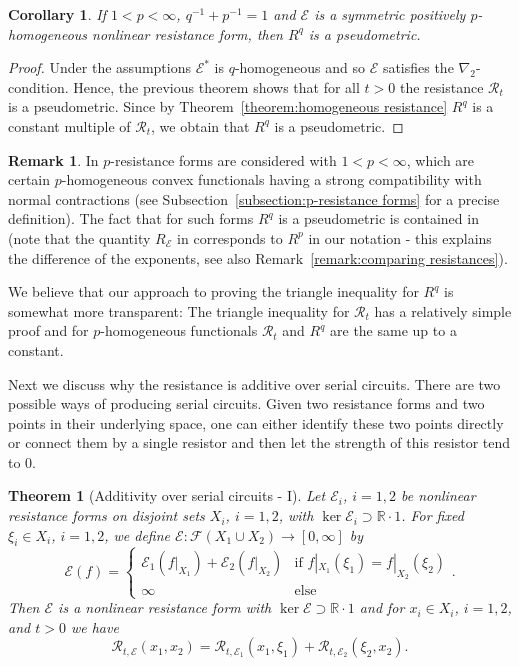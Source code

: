 \documentclass[a4paper,11pt,reqno]{amsart}
\newtheorem{theorem}[lemma]{Theorem}
\newtheorem{corollary}[lemma]{Corollary}
\theoremstyle{definition}
\newtheorem{remark}[lemma]{Remark}
\numberwithin{equation}{section}
\newcommand{\cR}{{\mathcal R}}
\newcommand{\cE}{{\mathcal E}}
\newcommand{\cF}{{\mathcal F}}
\newcommand{\R}{{\mathbb R}}
\newcommand{\1}{\mathds{1}}
\begin{document}
\begin{corollary}
 If $1 < p < \infty$, $q^{-1} + p^{-1} = 1$ and $\cE$ is a symmetric positively $p$-homogeneous nonlinear resistance form, then $R^q$ is a pseudometric. 
\end{corollary}
\begin{proof}
Under the assumptions $\cE^*$ is $q$-homogeneous and so $\cE$ satisfies the $\nabla_2$-condition. Hence, the previous theorem shows that for all $t> 0$ the resistance $\cR_t$ is a pseudometric. Since by Theorem~\ref{theorem:homogeneous resistance} $R^q$ is a constant multiple of  $\cR_t$, we obtain that $R^q$ is a pseudometric.
\end{proof}


\begin{remark}
In \cite{KS25} $p$-resistance forms are considered with $1 < p < \infty$, which are certain $p$-homogeneous convex functionals having a strong compatibility with normal contractions (see Subsection~\ref{subsection:p-resistance forms} for a precise definition). The fact that for such forms $R^q$ is a pseudometric is contained in \cite[Corollary~6.32]{KS25} (note that the quantity $R_\cE$ in  \cite{KS25} corresponds to $R^p$ in our notation -  this explains the difference of the exponents, see also Remark~\ref{remark:comparing resistances}). 

We believe that our approach to proving the triangle inequality for $R^q$ is somewhat more transparent: The triangle inequality for $\cR_t$ has a relatively simple proof and for $p$-homogeneous functionals $\cR_t$ and $R^q$ are the same up to a constant.  
\end{remark}



Next we discuss why the resistance is additive over serial circuits. There are two possible ways of producing serial circuits. Given two resistance forms and two points in their underlying space, one can either identify these two points directly or connect them by a single resistor and then let the strength of this resistor tend to $0$.   

\begin{theorem}[Additivity over serial circuits - I] \label{theorem:additivity serial circuits}
 Let $\cE_i$, $i = 1,2$ be nonlinear resistance forms on disjoint sets $X_i$, $i = 1,2$, with $\ker \cE_i \supset \R \cdot 1$. For fixed $\xi_i \in X_i$, $i = 1,2$, we define $\cE \colon \cF(X_1 \cup X_2) \to [0,\infty]$ by
 $$\cE(f) = \begin{cases}
                                                               \cE_1(f|_{X_1}) +  \cE_2(f|_{X_2}) &\text{if } f|_{X_1}(\xi_1) =  f|_{X_2}(\xi_2)\\
                                                               \infty &\text{else}
                                                               \end{cases}.
$$
 Then $\cE$ is a nonlinear resistance form with $\ker \cE \supset \R \cdot 1$ and for $x_i \in X_i$, $i = 1,2$, and $t > 0$  we have
 $$\cR_{t,\cE}(x_1,x_2) = \cR_{t,\cE_1}(x_1,\xi_1)  + \cR_{t,\cE_2}(\xi_2,x_2).$$
\end{theorem}
\end{document}
